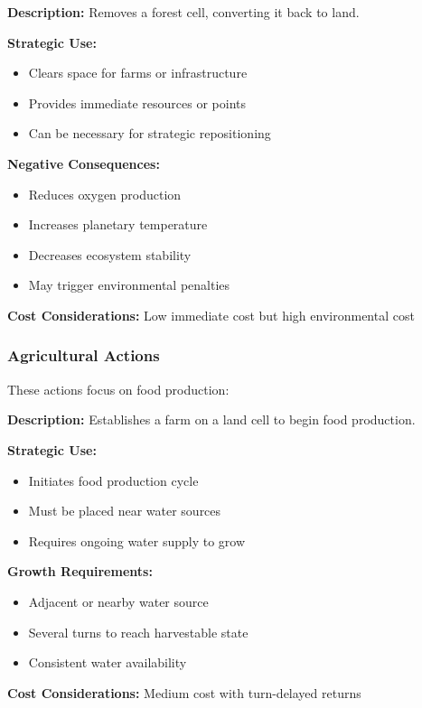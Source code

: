 \documentclass[12pt,a4paper]{article}
\begin{document}
\begin{tcolorbox}[colback=red!5,colframe=red!50!black,title=Clear Forest]
\textbf{Description:} Removes a forest cell, converting it back to land.

\textbf{Strategic Use:}
\begin{itemize}
    \item Clears space for farms or infrastructure
    \item Provides immediate resources or points
    \item Can be necessary for strategic repositioning
\end{itemize}

\textbf{Negative Consequences:}
\begin{itemize}
    \item Reduces oxygen production
    \item Increases planetary temperature
    \item Decreases ecosystem stability
    \item May trigger environmental penalties
\end{itemize}

\textbf{Cost Considerations:} Low immediate cost but high environmental cost
\end{tcolorbox}

\subsubsection{Agricultural Actions}

These actions focus on food production:

\begin{tcolorbox}[colback=yellow!5,colframe=yellow!50!black,title=Plant Crop]
\textbf{Description:} Establishes a farm on a land cell to begin food production.

\textbf{Strategic Use:}
\begin{itemize}
    \item Initiates food production cycle
    \item Must be placed near water sources
    \item Requires ongoing water supply to grow
\end{itemize}

\textbf{Growth Requirements:}
\begin{itemize}
    \item Adjacent or nearby water source
    \item Several turns to reach harvestable state
    \item Consistent water availability
\end{itemize}

\textbf{Cost Considerations:} Medium cost with turn-delayed returns
\end{tcolorbox}
\end{document}
